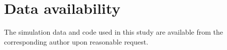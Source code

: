 \documentclass[preprint,12pt]{elsarticle}
\begin{document}
\section*{Data availability}
The simulation data and code used in this study are available from the corresponding author upon reasonable request.




\end{document}
